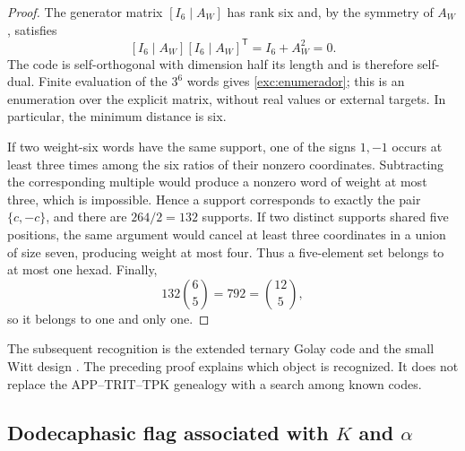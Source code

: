 \begin{proof}
The generator matrix $[I_6\mid A_W]$ has rank six and, by the symmetry
of $A_W$, satisfies
\[
 [I_6\mid A_W][I_6\mid A_W]^{\mathsf T}
   =I_6+A_W^2=0.
\]
The code is self-orthogonal with dimension half its length and is therefore
self-dual. Finite evaluation of the $3^6$ words gives
\eqref{exc:enumerador}; this is an enumeration over the explicit matrix,
without real values or external targets. In particular, the minimum
distance is six.

If two weight-six words have the same support, one of the signs $1,-1$
occurs at least three times among the six ratios of their nonzero
coordinates. Subtracting the corresponding multiple would produce
a nonzero word of weight at most three, which is impossible. Hence a support
corresponds to exactly the pair $\{c,-c\}$, and there are $264/2=132$
supports. If two distinct supports shared five positions,
the same argument would cancel at least three coordinates in a union
of size seven, producing weight at most four. Thus a
five-element set belongs to at most one hexad. Finally,
\[
 132\binom65=792=\binom{12}5,
\]
so it belongs to one and only one.
\end{proof}

The subsequent recognition is the extended ternary Golay code and
the small Witt design \cite{conwaysloane}. The preceding proof explains which object is
recognized. It does not replace the APP--TRIT--TPK genealogy with a search
among known codes.

\subsection{Dodecaphasic flag associated with \texorpdfstring{$K$ and $\alpha$}{K and alpha}}
\label{exc:bandera}



